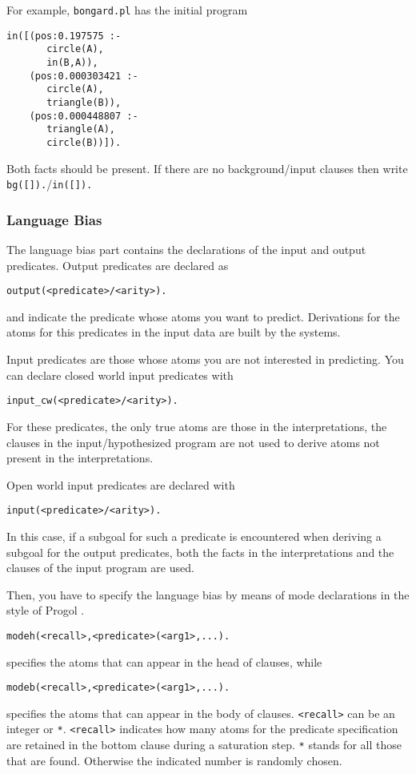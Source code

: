 \documentclass[a4paper,10pt]{article}
\newcommand{\href}[2]{\Link[#1]{}{} #2 \EndLink}
\begin{document}
For example, \verb|bongard.pl| has the initial program 
\begin{verbatim}
in([(pos:0.197575 :-
       circle(A),
       in(B,A)),
    (pos:0.000303421 :-
       circle(A),
       triangle(B)), 
    (pos:0.000448807 :-
       triangle(A),
       circle(B))]).
\end{verbatim}
Both facts should be present. If there are no background/input clauses then write \verb|bg([]).|/\verb|in([]).|


\subsubsection{Language Bias}
%
The language bias part contains the declarations of the input and output predicates.
Output predicates are declared as
\begin{verbatim}
output(<predicate>/<arity>).
\end{verbatim}
and indicate the predicate whose atoms you want to predict. Derivations for the atoms for this predicates in the input data
are built by the systems.

Input predicates are those whose atoms you are not interested in predicting. You can declare closed world input predicates with
\begin{verbatim}
input_cw(<predicate>/<arity>).
\end{verbatim}
For these predicates, the only true atoms are those in the interpretations, the clauses in the input/hypothesized program are not used to derive atoms not present in the interpretations.

Open world input predicates are declared with
\begin{verbatim}
input(<predicate>/<arity>).
\end{verbatim}
In this case, if a subgoal for such a predicate is encountered when deriving a subgoal for the output predicates, 
both the facts in the interpretations and the clauses of the input program are used.

Then, you have to specify the language bias by means of mode declarations in the style of 
\href{http://www.doc.ic.ac.uk/\string ~shm/progol.html}{Progol}.
\begin{verbatim}
modeh(<recall>,<predicate>(<arg1>,...).
\end{verbatim}
specifies the atoms that can appear in the head of clauses, while
\begin{verbatim}
modeb(<recall>,<predicate>(<arg1>,...).
\end{verbatim}
specifies the atoms that can appear in the body of clauses.
\texttt{<recall>} can be an integer or \texttt{*}.
\texttt{<recall>} indicates how many atoms for the predicate specification are
retained in the bottom clause during a saturation step. \texttt{*} stands for all those that are found. Otherwise the indicated number is randomly chosen.
\end{document}

